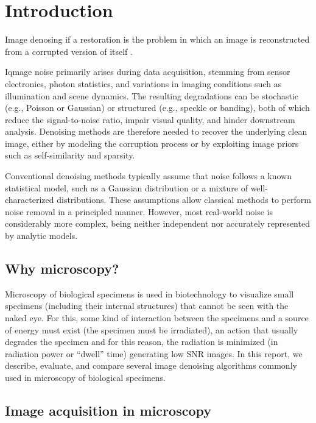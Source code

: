 \chapter{Introduction}

Image denosing if a restoration is the problem in which an image is
reconstructed from a corrupted version of itself
\cite{BUCHHOLZ2019277}.

Iqmage noise primarily arises during data acquisition, stemming from
sensor electronics, photon statistics, and variations in imaging
conditions such as illumination and scene dynamics. The resulting
degradations can be stochastic (e.g., Poisson or Gaussian) or
structured (e.g., speckle or banding), both of which reduce the
signal-to-noise ratio, impair visual quality, and hinder downstream
analysis. Denoising methods are therefore needed to recover the
underlying clean image, either by modeling the corruption process or
by exploiting image priors such as self-similarity and
sparsity. %

Conventional denoising methods typically assume that noise follows a
known statistical model, such as a Gaussian distribution or a mixture
of well-characterized distributions. These assumptions allow
classical methods to perform noise removal in a principled
manner. However, most real-world noise is considerably more complex,
being neither independent nor accurately represented by analytic
models.  %

\section{Why microscopy?}
Microscopy of biological specimens is used in biotechnology to
visualize small specimens (including their internal structures) that
cannot be seen with the naked eye. For this, some kind of interaction
between the specimens and a source of energy must exist (the specimen
must be irradiated), an action that usually degrades the specimen and
for this reason, the radiation is minimized (in radiation power or
``dwell'' time) generating low SNR images. In this report, we describe,
evaluate, and compare several image denoising algorithms commonly used
in microscopy of biological specimens.

\section{Image acquisition in microscopy}


